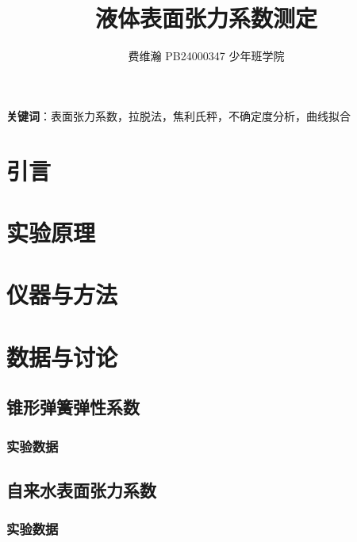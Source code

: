 \documentclass[10pt,a4paper]{article}
\title{液体表面张力系数测定}
\author{费维瀚 PB24000347 少年班学院}
\begin{document}
    \maketitle
    \begin{abstract}
       
    \end{abstract}

	\par \textbf{关键词}：表面张力系数，拉脱法，焦利氏秤，不确定度分析，曲线拟合
	\section*{引言}
    
	\section{实验原理}
    
    \section{仪器与方法}
    
    \section{数据与讨论}
        \subsection{锥形弹簧弹性系数}
        \subsubsection{实验数据}
            
        \subsection{自来水表面张力系数}
        \subsubsection{实验数据}
\end{document}

